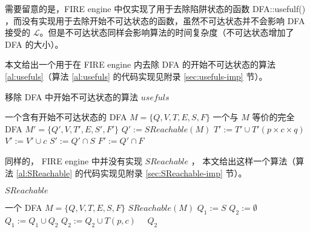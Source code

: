 需要留意的是，FIRE engine 中仅实现了用于去除陷阱状态的函数 DFA::usefulf() ，而没有实现用于去除开始不可达状态的函数，虽然不可达状态并不会影响 DFA 接受的 $\mathcal{L} $。但是不可达状态同样会影响算法的时间复杂度（不可达状态增加了 DFA 的大小）。

本文给出一个用于在 FIRE engine 内去除 DFA 的开始不可达状态的算法 \ref{al:usefuls}（算法 \ref{al:usefuls} 的代码实现见附录 \ref{sec:usefuls-imp} 节）。

\begin{algorithm}
    \caption{ 移除 DFA 中开始不可达状态的算法 $usefuls$ }\label{al:usefuls}
    \begin{algorithmic}[1]
        \Require 一个含有开始不可达状态的 DFA $M=\{Q,V,T,E,S,F\}$
        \Ensure 一个与 $M$ 等价的完全 DFA $M'=\{Q',V,T',E,S',F'\}$
        \Statex {}
            \State $Q' := SReachable(M) $
                        \State $ T' := T' \cup T'(p\times c \times q) $
                        \State $ V' := V' \cup c $
                    \EndIf
                \EndFor
            \EndFor
            \State $S':=Q' \cap S$
            \State $F':=Q' \cap F$
        \EndFunction
    \end{algorithmic}
\end{algorithm}

同样的， FIRE engine 中并没有实现 $SReachable$ ， 本文给出这样一个算法（算法 \ref{al:SReachable} 的代码实现见附录 \ref{sec:SReachable-imp} 节）。

\begin{algorithm}
    \caption{ $SReachable$ }\label{al:SReachable}
    \small%
    \begin{algorithmic}[1]
        \Require 一个 DFA $M=\{Q,V,T,E,S,F\}$
        \Ensure $SReachable(M)$
        \Statex %
            \State $ Q_1 := S $
            \State $ Q_2 := \emptyset $
            \Repeat
                \State $Q_1 := Q_1 \cup Q_2 $
                            $ Q_2 := Q_2 \cup T(p,c)  $
                        \EndIf
                    \EndFor
                \EndFor
             {~~$Q_2$}
        \EndFunction
    \end{algorithmic}
\end{algorithm}

